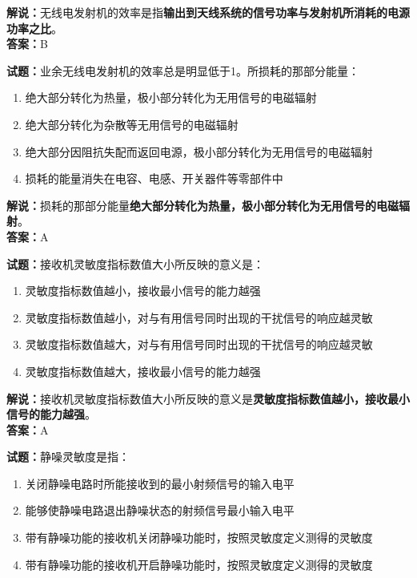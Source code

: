 \documentclass{ctexbook}
\begin{document}
\noindent\textbf{解说：}无线电发射机的效率是指\textbf{输出到天线系统的信号功率与发射机所消耗的电源功率之比}。\\\noindent\textbf{答案：}B%


\bigskip


\noindent\textbf{试题：}业余无线电发射机的效率总是明显低于1。所损耗的那部分能量：

\begin{enumerate}[leftmargin=3em]
	\item 绝大部分转化为热量，极小部分转化为无用信号的电磁辐射
	\item 绝大部分转化为杂散等无用信号的电磁辐射
	\item 绝大部分因阻抗失配而返回电源，极小部分转化为无用信号的电磁辐射
	\item 损耗的能量消失在电容、电感、开关器件等零部件中
\end{enumerate}

\noindent\textbf{解说：}损耗的那部分能量\textbf{绝大部分转化为热量，极小部分转化为无用信号的电磁辐射}。\\\noindent\textbf{答案：}A%


\bigskip


\noindent\textbf{试题：}接收机灵敏度指标数值大小所反映的意义是：

\begin{enumerate}[leftmargin=3em]
	\item 灵敏度指标数值越小，接收最小信号的能力越强
	\item 灵敏度指标数值越小，对与有用信号同时出现的干扰信号的响应越灵敏
	\item 灵敏度指标数值越大，对与有用信号同时出现的干扰信号的响应越灵敏
	\item 灵敏度指标数值越大，接收最小信号的能力越强
\end{enumerate}

\noindent\textbf{解说：}接收机灵敏度指标数值大小所反映的意义是\textbf{灵敏度指标数值越小，接收最小信号的能力越强}。\\\noindent\textbf{答案：}A%


\bigskip


\noindent\textbf{试题：}静噪灵敏度是指：

\begin{enumerate}[leftmargin=3em]
	\item 关闭静噪电路时所能接收到的最小射频信号的输入电平
	\item 能够使静噪电路退出静噪状态的射频信号最小输入电平
	\item 带有静噪功能的接收机关闭静噪功能时，按照灵敏度定义测得的灵敏度
	\item 带有静噪功能的接收机开启静噪功能时，按照灵敏度定义测得的灵敏度
\end{enumerate}
\end{document}
